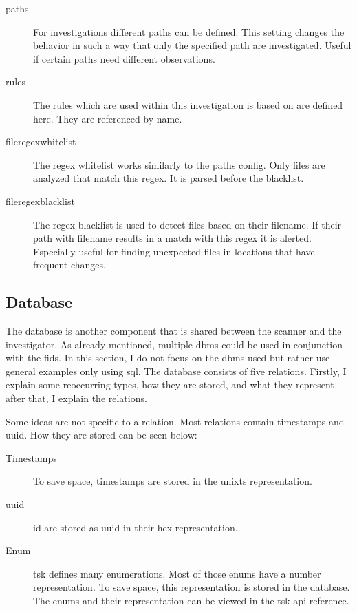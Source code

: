 \begin{description}
    \item [paths] For investigations different paths can be defined. This setting changes the behavior in such a way that only the specified path are investigated. Useful if certain paths need different observations.
    \item [rules] The rules which are used within this investigation is based on are defined here. They are referenced by name.
    \item [fileregexwhitelist] The \gls{regex} whitelist works similarly to the paths config. Only files are analyzed that match this \gls{regex}. It is parsed before the blacklist.
    \item [fileregexblacklist] The \gls{regex} blacklist is used to detect files based on their filename. If their path with filename results in a match with this \gls{regex} it is alerted. Especially useful for finding unexpected files in locations that have frequent changes.
\end{description}

\subsection{Database}
\label{sec:Database}

The database is another component that is shared between the scanner and the investigator. As already mentioned, multiple \gls{dbms} could be used in conjunction with the \gls{fids}. In this section, I do not focus on the \gls{dbms} used but rather use general examples only using \gls{sql}. The database consists of five relations. Firstly, I explain some reoccurring types, how they are stored, and what they represent after that, I explain the relations.

Some ideas are not specific to a relation. Most relations contain timestamps and \gls{uuid}. How they are stored can be seen below:

\begin{description}
	\item [Timestamps] To save space, timestamps are stored in the \gls{unixts} representation. 
	\item [\gls{uuid}] \gls{id} are stored as \gls{uuid} in their \gls{hex} representation. 
	\item [Enum] \gls{tsk} defines many enumerations. Most of those enums have a number representation. To save space, this representation is stored in the database. The enums and their representation can be viewed in the \gls{tsk} \gls{api} reference. \cite{tsk:file:header}
\end{description}

